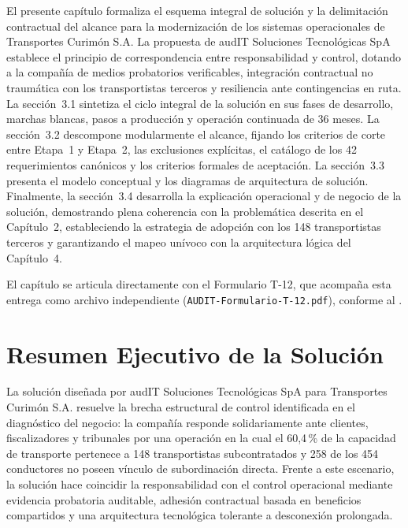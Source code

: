 
El presente capítulo formaliza el esquema integral de solución y la delimitación contractual del
alcance para la modernización de los sistemas operacionales de Transportes Curimón S.A.
La propuesta de audIT Soluciones Tecnológicas SpA establece el principio de correspondencia entre
responsabilidad y control, dotando a la compañía de medios probatorios verificables, integración
contractual no traumática con los transportistas terceros y resiliencia ante contingencias en ruta.
La sección~3.1 sintetiza el ciclo integral de la solución en sus fases de desarrollo, marchas blancas,
pasos a producción y operación continuada de 36 meses. La sección~3.2 descompone modularmente el alcance,
fijando los criterios de corte entre Etapa~1 y Etapa~2, las exclusiones explícitas, el catálogo de los 42
requerimientos canónicos y los criterios formales de aceptación. La sección~3.3 presenta el modelo conceptual
y los diagramas de arquitectura de solución. Finalmente, la sección~3.4 desarrolla la explicación
operacional y de negocio de la solución, demostrando plena coherencia con la problemática descrita en el
Capítulo~2, estableciendo la estrategia de adopción con los 148 transportistas terceros y garantizando el
mapeo unívoco con la arquitectura lógica del Capítulo~4.

El capítulo se articula directamente con el Formulario T-12, que acompaña esta entrega como archivo
independiente (\texttt{AUDIT-Formulario-T-12.pdf}), conforme al .

\section{Resumen Ejecutivo de la Solución}\label{sec:3-resumen-ejecutivo}

La solución diseñada por audIT Soluciones Tecnológicas SpA para Transportes Curimón S.A.
resuelve la brecha estructural de control identificada en el diagnóstico del negocio: la compañía
responde solidariamente ante clientes, fiscalizadores y tribunales por una operación en la cual el
60,4\,\% de la capacidad de transporte pertenece a 148 transportistas subcontratados y 258 de los 454
conductores no poseen vínculo de subordinación directa.
Frente a este escenario, la solución hace coincidir la responsabilidad con el control operacional
mediante evidencia probatoria auditable, adhesión contractual basada en beneficios compartidos y una
arquitectura tecnológica tolerante a desconexión prolongada.

